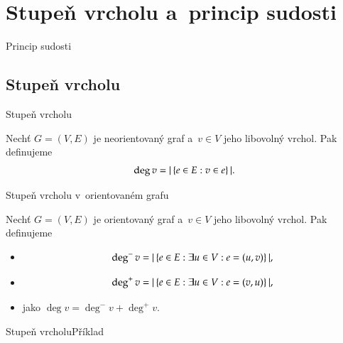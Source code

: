 \documentclass[11pt,professionalfont,aspectratio=43]{beamer}
\begin{document}
    \section{Stupeň vrcholu a~princip sudosti}

    \begin{titleframeenv}{Princip sudosti}
    \end{titleframeenv}

    \subsection{Stupeň vrcholu}

    \begin{frame}{Stupeň vrcholu}
        \begin{defblock}
            Nechť $G=(V,E)$ je neorientovaný graf a~$v\in V$ jeho libovolný vrchol. Pak definujeme 
            \[\deg{v}=|\left\{e\in E: v\in e\right\}|.\]
        \end{defblock}
    \end{frame}

    \begin{frame}{Stupeň vrcholu v~orientovaném grafu}
        \begin{defblock}
            Nechť $G=(V,E)$ je orientovaný graf a~$v\in V$ jeho libovolný vrchol. Pak definujeme
            \begin{itemize}
                \item {}
                \[\deg^{-}{v}=|\left\{e\in E: \exists u\in V: e=(u,v)\right\}|,\]
                \item {}
                \[\deg^{+}{v}=|\left\{e\in E: \exists u\in V: e=(v,u)\right\}|,\]
                \item {} jako $\deg{v}=\deg^{-}{v}+\deg^{+}{v}$.
            \end{itemize}
        \end{defblock}
    \end{frame}

    \begin{frame}{Stupeň vrcholu}{Příklad}
    \end{frame}
\end{document}
